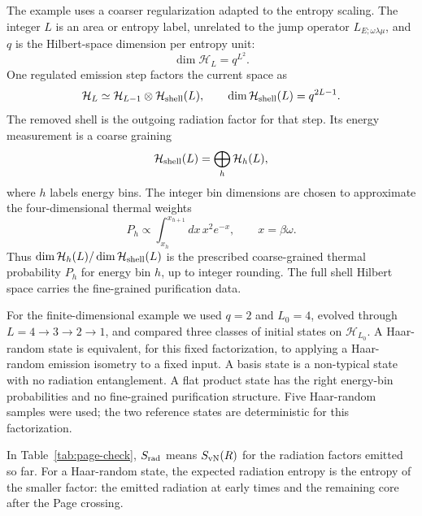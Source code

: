 \documentclass[12pt]{article}
\begin{document}
The example uses a coarser regularization adapted to the entropy scaling.  The
integer $L$ is an area or entropy label, unrelated to the jump operator
$L_{E;\omega\lambda\mu}$, and $q$ is the Hilbert-space dimension per entropy
unit:
\begin{equation}
    \dim\mathcal H_L=q^{L^2}.
\end{equation}
One regulated emission step factors the current space as
\begin{equation}
    \mathcal H_L\simeq \mathcal H_{L-1}\otimes\mathcal H_{\rm shell}(L),
    \qquad
    \dim\mathcal H_{\rm shell}(L)=q^{2L-1}.
\end{equation}
The removed shell is the outgoing radiation factor for that step.  Its energy
measurement is a coarse graining
\begin{equation}
    \mathcal H_{\rm shell}(L)=\bigoplus_h \mathcal H_h(L),
\end{equation}
where $h$ labels energy bins.  The integer bin dimensions are chosen to
approximate the four-dimensional thermal weights
\begin{equation}
    P_h\propto\int_{x_h}^{x_{h+1}}dx\,x^2e^{-x},
    \qquad x=\beta\omega.
\end{equation}
Thus $\dim\mathcal H_h(L)/\dim\mathcal H_{\rm shell}(L)$ is the prescribed
coarse-grained thermal probability $P_h$ for energy bin $h$, up to integer
rounding.  The full shell Hilbert space carries the fine-grained purification
data.

For the finite-dimensional example we used $q=2$ and $L_0=4$, evolved through
$L=4\to3\to2\to1$, and compared three classes of initial states on
$\mathcal H_{L_0}$.  A Haar-random state is equivalent, for this fixed
factorization, to applying a Haar-random emission isometry to a fixed input.
A basis state is a non-typical state with no radiation entanglement.  A flat
product state has the right energy-bin probabilities and no fine-grained
purification structure.  Five Haar-random samples were used; the two reference
states are deterministic for this factorization.

In Table~\ref{tab:page-check}, $S_{\rm rad}$ means $S_{\rm vN}(R)$ for the
radiation factors emitted so far.  For a Haar-random state, the expected
radiation entropy is the entropy of the smaller factor: the emitted radiation
at early times and the remaining core after the Page crossing.
\end{document}
